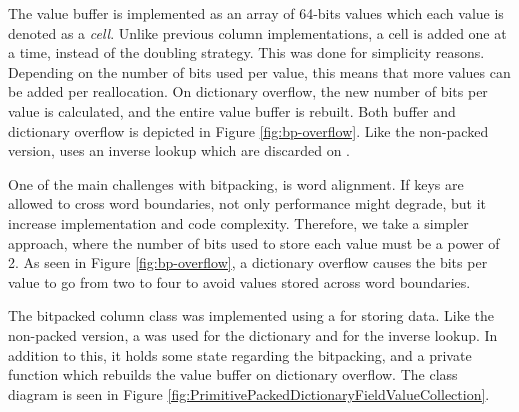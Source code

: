 The value buffer is implemented as an array of 64-bits values which each value is denoted as a \textit{cell}. Unlike previous column implementations, a cell is added one at a time, instead of the doubling strategy. This was done for simplicity reasons. Depending on the number of bits used per value, this means that more values can be added per reallocation. On dictionary overflow, the new number of bits per value is calculated, and the entire value buffer is rebuilt. Both buffer and dictionary overflow is depicted in Figure \ref{fig:bp-overflow}. Like the non-packed version,  uses an inverse lookup which are discarded on .

One of the main challenges with bitpacking, is word alignment. If keys are allowed to cross word boundaries, not only performance might degrade, but it increase implementation and code complexity. Therefore, we take a simpler approach, where the number of bits used to store each value must be a power of 2. As seen in Figure \ref{fig:bp-overflow}, a dictionary overflow causes the bits per value to go from two to four to avoid values stored across word boundaries.

The bitpacked column class was implemented using a  for storing data. Like the non-packed version, a  was used for the dictionary and  for the inverse lookup. In addition to this, it holds some state regarding the bitpacking, and a private function  which rebuilds the value buffer on dictionary overflow. The class diagram is seen in Figure \ref{fig:PrimitivePackedDictionaryFieldValueCollection}.


